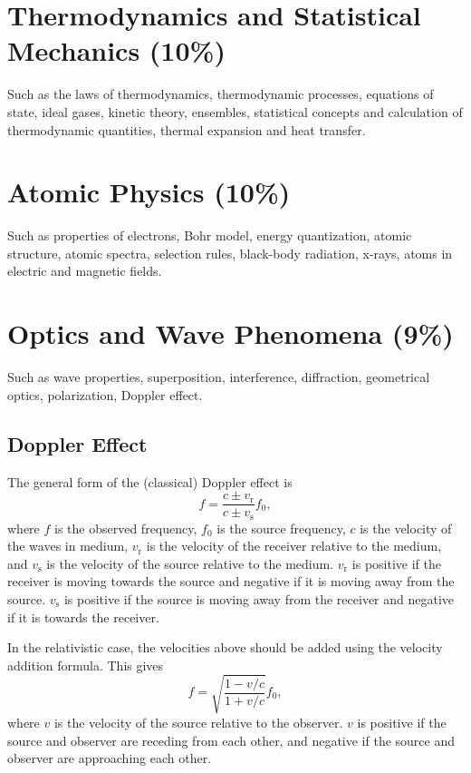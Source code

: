 \documentclass[%
 reprint,
superscriptaddress,
 amsmath,amssymb,
 aps,
prc,
]{revtex4-1}
\begin{document}
\section{Thermodynamics and Statistical Mechanics (10\%)}
Such as the laws of thermodynamics, thermodynamic processes, equations of state, ideal gases, kinetic theory, ensembles, statistical concepts and calculation of thermodynamic quantities, thermal expansion and heat transfer.

\section{Atomic Physics (10\%)}
Such as properties of electrons, Bohr model, energy quantization, atomic structure, atomic spectra, selection rules, black-body radiation, x-rays, atoms in electric and magnetic fields.

\section{Optics and Wave Phenomena (9\%)}
Such as wave properties, superposition, interference, diffraction, geometrical optics, polarization, Doppler effect.

\subsection{Doppler Effect}
The general form of the (classical) Doppler effect is
\begin{equation}
	f=\frac{c \pm v_\text{r}}{c \pm v_\text{s}} f_0,
\end{equation}
where $f$ is the observed frequency, $f_0$ is the source frequency, $c$ is the velocity of the waves in medium, $v_\text{r}$ is the velocity of the receiver relative to the medium, and $v_\text{s}$ is the velocity of the source relative to the medium. $v_\text{r}$ is positive if the receiver is moving towards the source and negative if it is moving away from the source. $v_\text{s}$ is positive if the source is moving away from the receiver and negative if it is towards the receiver.

In the relativistic case, the velocities above should be added using the velocity addition formula. This gives 
\begin{equation}
	f = \sqrt{\frac{1 - v/c}{1 + v/c}} f_0,
\end{equation}
where $v$ is the velocity of the source relative to the observer. $v$ is positive if the source and observer are receding from each other, and negative if the source and observer are approaching each other.
\end{document}
